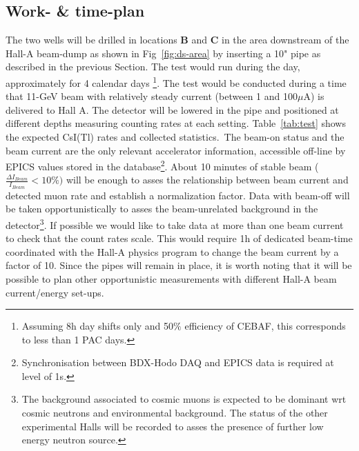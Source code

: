 \subsection{Work- \& time-plan}
The two wells  will be drilled in locations {\bf B} and {\bf C} in the area downstream of the Hall-A beam-dump as shown in Fig~\ref{fig:ds-area} by inserting a 10" pipe as described in the previous Section. The test would  
run during the day, approximately for 4 calendar days \footnote{Assuming 8h day shifts only and  50$\%$ efficiency of CEBAF, this corresponds to less than 1 PAC days.}.
The test would be conducted during a time that 11-GeV beam with relatively steady current (between 1 and 100$\mu$A) is delivered  to Hall A.
The detector will be lowered in the pipe and positioned at different depths measuring counting rates at each setting. Table~\ref{tab:test} shows the expected CsI(Tl) rates and collected statistics.\
The beam-on status and the beam current are the only 
relevant accelerator information,  accessible off-line by  EPICS values stored in the  database\footnote{Synchronisation between BDX-Hodo DAQ and EPICS data  is required  at level of 1s.}. About 10 minutes of stable beam ($\frac{\Delta I_{Beam}}{I_{Beam}}<10\%)$ will  be enough to asses the relationship between beam current and detected muon rate and establish a normalization factor. 
Data with beam-off will be taken opportunistically to asses the beam-unrelated background in the detector\footnote{The background  associated to cosmic muons is expected to be dominant wrt cosmic neutrons and environmental background. The status of the other experimental Halls will be recorded to asses the presence of further  low energy neutron source.}.
If possible  we would like to take data at more than one beam current to check that the count rates scale.
This  would require 1h of dedicated beam-time  coordinated with the Hall-A physics program to change the beam current by a factor of 10.
Since the pipes will remain in place, it is worth noting that it will be possible to plan other opportunistic measurements with different Hall-A beam current/energy  set-ups.
